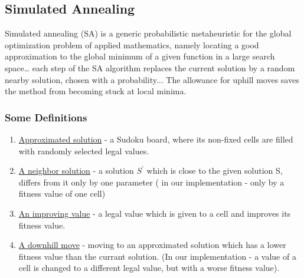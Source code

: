 \documentclass[fleqn,10pt]{SelfArx}
\begin{document}
\subsection{Simulated Annealing}
Simulated annealing (SA) is a generic probabilistic metaheuristic for the global optimization problem of applied mathematics, namely locating a good approximation to the global minimum of a given function in a large search space… each step of the SA algorithm replaces the current solution by a random nearby solution, chosen with a probability... The allowance for uphill moves saves the method from becoming stuck at local minima.
\subsubsection{Some Definitions}
\begin{enumerate}
\item \underline{Approximated solution} - a Sudoku board, where its non-fixed cells are filled with randomly selected legal values.
\item \underline{A neighbor solution} - a solution $S^{'}$ which is close to the given solution S, differs from it only by one parameter ( in our implementation - only by a fitness value of one cell)
\item \underline{An improving value} -  a legal value which is given to a cell and improves its fitness value.
\item \underline{A downhill move} - moving to an approximated solution which has a lower fitness value than the currant solution. (In our implementation - a value of a cell is changed to a different legal value, but with a worse fitness value).
\end{enumerate}
\end{document}
